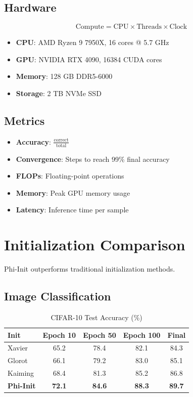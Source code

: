 \subsection{Hardware}

\begin{equation}
\text{Compute} = \text{CPU} \times \text{Threads} \times \text{Clock}
\end{equation}

\begin{itemize}
\item \textbf{CPU}: AMD Ryzen 9 7950X, 16 cores @ 5.7 GHz
\item \textbf{GPU}: NVIDIA RTX 4090, 16384 CUDA cores
\item \textbf{Memory}: 128 GB DDR5-6000
\item \textbf{Storage}: 2 TB NVMe SSD
\end{itemize}

\subsection{Metrics}

\begin{definition}
\label{def:metrics}
\begin{itemize}
\item \textbf{Accuracy}: $\frac{\text{correct}}{\text{total}}$
\item \textbf{Convergence}: Steps to reach 99\% final accuracy
\item \textbf{FLOPs}: Floating-point operations
\item \textbf{Memory}: Peak GPU memory usage
\item \textbf{Latency}: Inference time per sample
\end{itemize}
\end{definition}

\section{Initialization Comparison}

Phi-Init outperforms traditional initialization methods.

\subsection{Image Classification}

\begin{table}[h]
\centering
\caption{CIFAR-10 Test Accuracy (\%)}
\begin{tabular}{lcccc}
\toprule
Init & Epoch 10 & Epoch 50 & Epoch 100 & Final \\
\midrule
Xavier & 65.2 & 78.4 & 82.1 & 84.3 \\
Glorot & 66.1 & 79.2 & 83.0 & 85.1 \\
Kaiming & 68.4 & 81.3 & 85.2 & 86.8 \\
\textbf{Phi-Init} & \textbf{72.1} & \textbf{84.6} & \textbf{88.3} & \textbf{89.7} \\
\bottomrule
\end{tabular}
\end{table}

